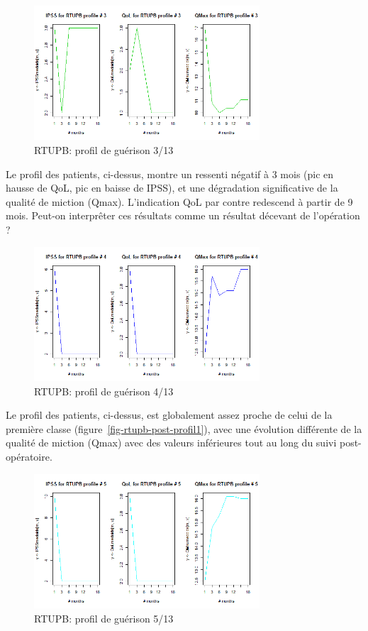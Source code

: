 \begin{figure}[H]
\centering
\includegraphics[width=0.75\textwidth]{../Fig/RTUPB/rtupb-profil-post-03.png}
\caption{RTUPB: profil de guérison 3/13}
\label{fig-rtupb-post-profil3}
\end{figure}

Le profil des patients, ci-dessus, montre un ressenti négatif à 3 mois (pic en hausse de QoL, pic en baisse de IPSS), et une dégradation significative de la qualité de miction (Qmax). L'indication QoL par contre redescend à partir de 9 mois. Peut-on interprêter ces résultats comme un résultat décevant de l'opération ?

\begin{figure}[H]
\centering
\includegraphics[width=0.75\textwidth]{../Fig/RTUPB/rtupb-profil-post-04.png}
\caption{RTUPB: profil de guérison 4/13}
\label{fig-rtupb-post-profil4}
\end{figure}

Le profil des patients, ci-dessus, est globalement assez proche de celui de la première classe (figure~\ref{fig-rtupb-post-profil1}), avec une évolution différente de la qualité de miction (Qmax) avec des valeurs inférieures tout au long du suivi post-opératoire.

\begin{figure}[H]
\centering
\includegraphics[width=0.75\textwidth]{../Fig/RTUPB/rtupb-profil-post-05.png}
\caption{RTUPB: profil de guérison 5/13}
\label{fig-rtupb-post-profil5}
\end{figure}

